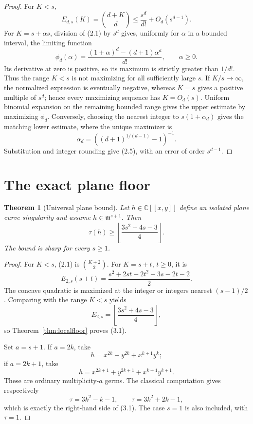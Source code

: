 \documentclass[11pt,a4paper]{article}
\newtheorem{theorem}{Theorem}[section]
\theoremstyle{definition}
\numberwithin{equation}{section}
\newcommand{\kk}{\mathbb C}
\newcommand{\m}{\mathfrak m}
\begin{document}
\begin{proof}
For \(K<s\),
\[
 E_{d,s}(K)=\binom{d+K}{d}
 \leq \frac{s^d}{d!}+O_d(s^{d-1}).
\]
For \(K=s+\alpha s\), division of (2.1) by \(s^d\) gives, uniformly for
\(\alpha\) in a bounded interval, the limiting function
\[
 \phi_d(\alpha)=\frac{(1+\alpha)^d-(d+1)\alpha^d}{d!},
 \qquad \alpha\ge0.
\]
Its derivative at zero is positive, so its maximum is strictly greater
than \(1/d!\).  Thus the range \(K<s\) is not maximizing for all sufficiently
large \(s\).  If \(K/s\to\infty\), the normalized expression is eventually
negative, whereas \(K=s\) gives a positive multiple of \(s^d\); hence every
maximizing sequence has \(K=O_d(s)\).  Uniform binomial expansion on the
remaining bounded range gives the upper estimate by maximizing
\(\phi_d\).  Conversely, choosing the nearest integer to
\(s(1+\alpha_d)\) gives the matching lower estimate, where the unique
maximizer is
\[
 \alpha_d=\left((d+1)^{1/(d-1)}-1\right)^{-1}.
\]
Substitution and integer rounding give (2.5), with an error of order
\(s^{d-1}\).
\end{proof}

\section{The exact plane floor}

\begin{theorem}[Universal plane bound]\label{thm:plane}
Let \(h\in\kk[[x,y]]\) define an isolated plane curve singularity and
assume \(h\in\m^{s+1}\).  Then
\begin{equation}
 \tau(h)\ge
 \left\lfloor\frac{3s^2+4s-3}{4}\right\rfloor.
\end{equation}
The bound is sharp for every \(s\ge1\).
\end{theorem}

\begin{proof}
For \(K<s\), (2.1) is \(\binom{K+2}{2}\).  For \(K=s+t\), \(t\ge0\), it is
\[
 E_{2,s}(s+t)
 =\frac{s^2+2st-2t^2+3s-2t-2}{2}.
\]
The concave quadratic is maximized at the integer or integers nearest
\((s-1)/2\).  Comparing with the range \(K<s\) yields
\[
 E_{2,s}=\left\lfloor\frac{3s^2+4s-3}{4}\right\rfloor,
\]
so Theorem~\ref{thm:localfloor} proves (3.1).

Set \(a=s+1\).  If \(a=2k\), take
\[
 h=x^{2k}+y^{2k}+x^{k+1}y^k;
\]
if \(a=2k+1\), take
\[
 h=x^{2k+1}+y^{2k+1}+x^{k+1}y^{k+1}.
\]
These are ordinary multiplicity-\(a\) germs.  The classical computation
\cite{BGM1988,CaninoEtAlArxiv} gives respectively
\[
 \tau=3k^2-k-1,
 \qquad
 \tau=3k^2+2k-1,
\]
which is exactly the right-hand side of (3.1).  The case \(s=1\) is also
included, with \(\tau=1\).
\end{proof}
\end{document}
